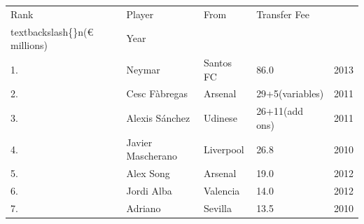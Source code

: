 \documentclass{article}
\begin{document}
\begin{tabular}{lllll}
\toprule
Rank & Player & From & Transfer Fee\\textbackslash\{\}n(€ millions) & Year \\
\midrule
1. & Neymar & Santos FC & 86.0 & 2013 \\
2. & Cesc Fàbregas & Arsenal & 29+5(variables) & 2011 \\
3. & Alexis Sánchez & Udinese & 26+11(add ons) & 2011 \\
4. & Javier Mascherano & Liverpool & 26.8 & 2010 \\
5. & Alex Song & Arsenal & 19.0 & 2012 \\
6. & Jordi Alba & Valencia & 14.0 & 2012 \\
7. & Adriano & Sevilla & 13.5 & 2010 \\
\bottomrule
\end{tabular}
\end{document}
